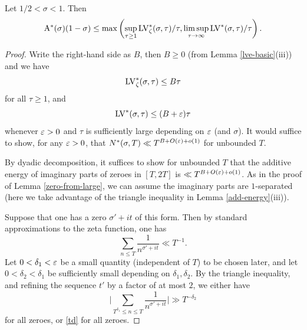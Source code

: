 \begin{lemma}\label{zeroe-from-large}  Let $1/2 < \sigma < 1$.  Then
$$ \mathrm{A}^*(\sigma)(1-\sigma) \leq \max\left( \sup_{\tau \geq 1} \mathrm{LV}^*_\zeta(\sigma,\tau)/\tau, \limsup_{\tau \to \infty} \mathrm{LV}^*(\sigma,\tau)/\tau \right).$$
\end{lemma}

\begin{proof}
Write the right-hand side as $B$, then $B \geq 0$ (from Lemma \ref{lve-basic}(iii)) and we have
\begin{equation}\label{lvze-bound}
    \mathrm{LV}^*_\zeta(\sigma,\tau) \leq B \tau
\end{equation}
for all $\tau \geq 1$, and
\begin{equation}\label{lve-bound}
    \mathrm{LV}^*(\sigma,\tau) \leq (B+\varepsilon) \tau
\end{equation}
whenever $\varepsilon>0$ and $\tau$ is sufficiently large depending on $\varepsilon$ (and $\sigma$).  It would suffice to show, for any $\varepsilon>0$, that $N^*(\sigma,T) \ll T^{B+O(\varepsilon)+o(1)}$ for unbounded $T$.

By dyadic decomposition, it suffices to show for unbounded $T$ that the additive energy of imaginary parts of zeroes in $[T,2T]$ is $\ll T^{B+O(\varepsilon)+o(1)}$.  As in the proof of Lemma \ref{zero-from-large}, we can assume the imaginary parts are $1$-separated (here we take advantage of the triangle inequality in Lemma \ref{add-energy}(iii)).

Suppose that one has a zero $\sigma'+i t$ of this form.  Then by standard approximations to the zeta function, one has
$$ \sum_{n \leq T} \frac{1}{n^{\sigma'+it}} \ll T^{-1}.$$
Let $0 < \delta_1 < \varepsilon$ be a small quantity (independent of $T$) to be chosen later, and let $0 < \delta_2 < \delta_1$ be sufficiently small depending on $\delta_1,\delta_2$.  By the triangle inequality, and refining the sequence $t'$ by a factor of at most $2$, we either have
$$ \bigg|\sum_{T^{\delta_1} \leq n \leq T} \frac{1}{n^{\sigma'+it}} \bigg| \gg T^{-\delta_2}$$
for all zeroes, or \eqref{td}
for all zeroes.


\end{proof}
